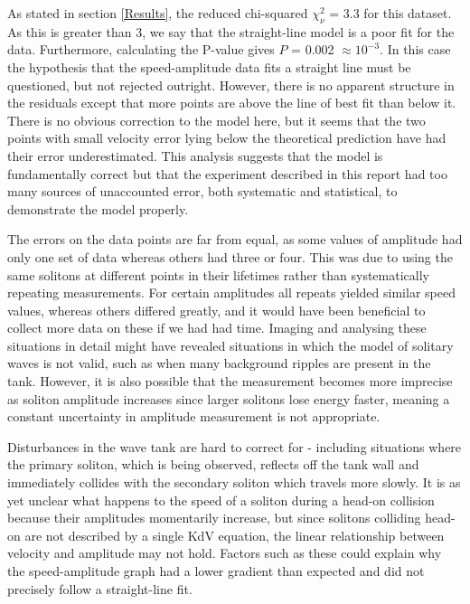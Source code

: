 \documentclass[10pt, twocolumn]{revtex4}    %
\begin{document}
As stated in section \ref{Results}, the reduced chi-squared $\chi_\nu^2$ = 3.3 for this dataset. As this is greater than 3, we say that the straight-line model is a poor fit for the data. Furthermore, calculating the P-value gives $P$ = 0.002 $\approx 10^{-3}$. In this case the hypothesis that the speed-amplitude data fits a straight line must be questioned, but not rejected outright. However, there is no apparent structure in the residuals except that more points are above the line of best fit than below it. There is no obvious correction to the model here, but it seems that the two points with small velocity error lying below the theoretical prediction have had their error underestimated. This analysis suggests that the model is fundamentally correct but that the experiment described in this report had too many sources of unaccounted error, both systematic and statistical, to demonstrate the model properly.

The errors on the data points are far from equal, as some values of amplitude had only one set of data whereas others had three or four. This was due to using the same solitons at different points in their lifetimes rather than systematically repeating measurements. For certain amplitudes all repeats yielded similar speed values, whereas others differed greatly, and it would have been beneficial to collect more data on these if we had had time. Imaging and analysing these situations in detail might have revealed situations in which the model of solitary waves is not valid, such as when many background ripples are present in the tank. However, it is also possible that the measurement becomes more imprecise as soliton amplitude increases since larger solitons lose energy faster, meaning a constant uncertainty in amplitude measurement is not appropriate. 

Disturbances in the wave tank are hard to correct for - including situations where the primary soliton, which is being observed, reflects off the tank wall and immediately collides with the secondary soliton which travels more slowly. It is as yet unclear what happens to the speed of a soliton during a head-on collision because their amplitudes momentarily increase, but since solitons colliding head-on are not described by a single KdV equation, the linear relationship between velocity and amplitude may not hold. Factors such as these could explain why the speed-amplitude graph had a lower gradient than expected and did not precisely follow a straight-line fit. 
\end{document}
